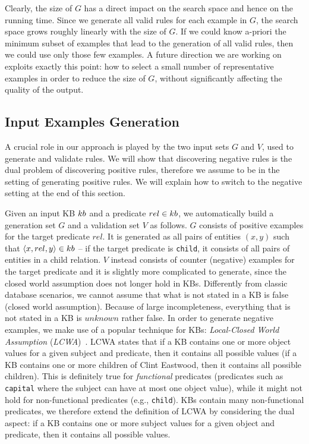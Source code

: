 Clearly, the size of $G$ has a direct impact on the search space and hence on the running time. Since we generate all valid rules for each example in $G$, the search space grows roughly linearly with the size of $G$. If we could know a-priori the minimum subset of examples that lead to the generation of all valid rules, then we could use only those few examples. 
%
A future direction we are working on exploits exactly this point: how to select a small number of representative examples in order to reduce the size of $G$, without significantly affecting the quality of the output.

\subsection{Input Examples Generation} \label{sec:ex_generation}
A crucial role in our approach is played by the two input sets $G$ and $V$, used to generate and validate rules. We will show that discovering negative rules is the dual problem of discovering positive rules, therefore we assume to be in the setting of generating positive rules.
We will explain how to switch to the negative setting at the end of this section.

Given an input KB ${\sc kb}$ and a predicate $rel \in {\sc kb}$, we automatically build a generation set $G$ and a validation set $V$ as follows. $G$ consists of positive examples for the target predicate $rel$. It is generated as all pairs of entities $(x,y)$ such that $\langle x,rel,y\rangle \in {\sc kb}$ -- if the target predicate is \texttt{child}, it consists of all pairs of entities in a child relation.
$V$ instead consists of counter (negative) examples for the target predicate and it is slightly more complicated to generate, since the closed world assumption does not longer hold in KBs. Differently from classic database scenarios, we cannot assume that what is not stated in a KB is false (closed world assumption). Because of large incompleteness, everything that is not stated in a KB is $unknown$ rather false. In order to generate negative examples, we make use of a popular technique for KBs: \emph{Local-Closed World Assumption} (\emph{LCWA})~\cite{dong2014knowledge,galarraga2015fast}. LCWA states that if a KB contains one or more object values for a given subject and predicate, then it contains all possible values (if a KB contains one or more children of Clint Eastwood, then it contains all possible children). This is definitely true for \emph{functional} predicates (predicates such as \texttt{capital} where the subject can have at most one object value), while it might not hold for non-functional predicates (e.g., \texttt{child}). KBs contain many non-functional predicates, we therefore extend the definition of LCWA by considering the dual aspect: if a KB contains one or more subject values for a given object and predicate, then it contains all possible values. 

